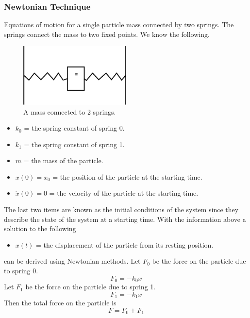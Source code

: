 \subsubsection{Newtonian Technique}
\label{Sec:NewtonianTechnique}
Equations of motion for a single particle mass connected by two springs. The
springs connect the mass to two fixed points. We know the following.
\begin{figure}    
    \centering
	\includegraphics[width=0.5\textwidth]{SpringMassSystem}    
    \caption{\label{Fig:SpringMassSystem}A mass connected to 2 springs.}
\end{figure}
\begin{itemize}
\item $k_{0}$ = the spring constant of spring 0.
\item $k_{1}$ = the spring constant of spring 1.
\item $m$ = the mass of the particle.
\item $x(0) = x_0$ = the position of the particle at the starting time.
\item $\dot{x}(0) = 0$ = the velocity of the particle at the starting time.
\end{itemize}
The last two items are known as the initial conditions of the system since they
describe the state of the system at a starting time. With the information above
a solution to the following
\begin{itemize}
\item $x(t)$ = the displacement of the particle from its resting position.
\end{itemize}
can be derived using Newtonian methods.
Let $F_{0}$ be the force on the particle due to spring 0.
\begin{equation}
	F_{0} = -k_{0}x
\end{equation}
Let $F_{1}$ be the force on the particle due to spring 1.
\begin{equation}
	F_{1} = -k_{1}x
\end{equation}
Then the total force on the particle is
\begin{equation}
	F = F_{0} + F_{1}
\end{equation}
